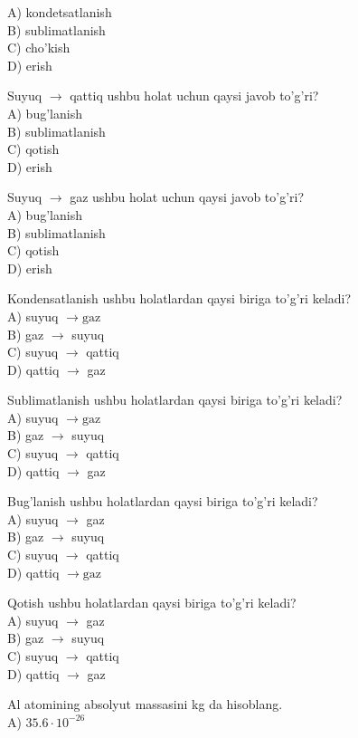 A) kondetsatlanish\\
B) sublimatlanish\\
C) cho'kish\\
D) erish
  \item Suyuq $\rightarrow$ qattiq ushbu holat uchun qaysi javob to'g'ri?\\
A) bug'lanish\\
B) sublimatlanish\\
C) qotish\\
D) erish
  \item Suyuq $\rightarrow$ gaz ushbu holat uchun qaysi javob to'g'ri?\\
A) bug'lanish\\
B) sublimatlanish\\
C) qotish\\
D) erish
  \item Kondensatlanish ushbu holatlardan qaysi biriga to'g'ri keladi?\\
A) suyuq $\rightarrow \mathrm{gaz}$\\
B) gaz $\rightarrow$ suyuq\\
C) suyuq $\rightarrow$ qattiq\\
D) qattiq $\rightarrow$ gaz
  \item Sublimatlanish ushbu holatlardan qaysi biriga to'g'ri keladi?\\
A) suyuq $\rightarrow \mathrm{gaz}$\\
B) gaz $\rightarrow$ suyuq\\
C) suyuq $\rightarrow$ qattiq\\
D) qattiq $\rightarrow$ gaz
  \item Bug'lanish ushbu holatlardan qaysi biriga to'g'ri keladi?\\
A) suyuq $\rightarrow$ gaz\\
B) gaz $\rightarrow$ suyuq\\
C) suyuq $\rightarrow$ qattiq\\
D) qattiq $\rightarrow \mathrm{gaz}$
  \item Qotish ushbu holatlardan qaysi biriga to'g'ri keladi?\\
A) suyuq $\rightarrow$ gaz\\
B) gaz $\rightarrow$ suyuq\\
C) suyuq $\rightarrow$ qattiq\\
D) qattiq $\rightarrow$ gaz
  \item Al atomining absolyut massasini kg da hisoblang.\\
A) $35.6 \cdot 10^{-26}$\\
